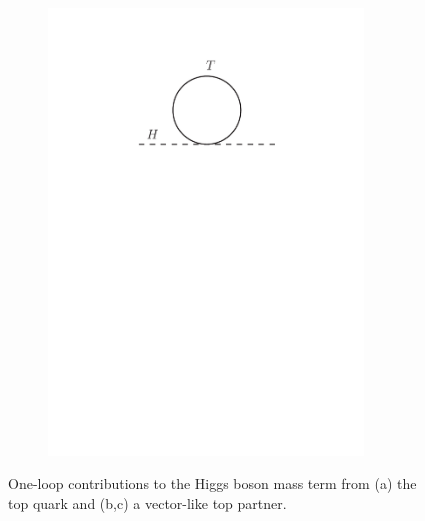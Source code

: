 \begin{figure}[tb]
\begin{center}
\begin{subfigure}{0.32\textwidth}
  	\includegraphics[width=0.92\textwidth]{Theory/FeynmanGraphs/loop_T_good}
    \caption{} \end{subfigure}
	\caption{One-loop contributions to the Higgs boson mass term from (a) the top quark and (b,c) a vector-like top partner.}
          \label{fig:VLQ_loop}
\end{center}
\end{figure}

